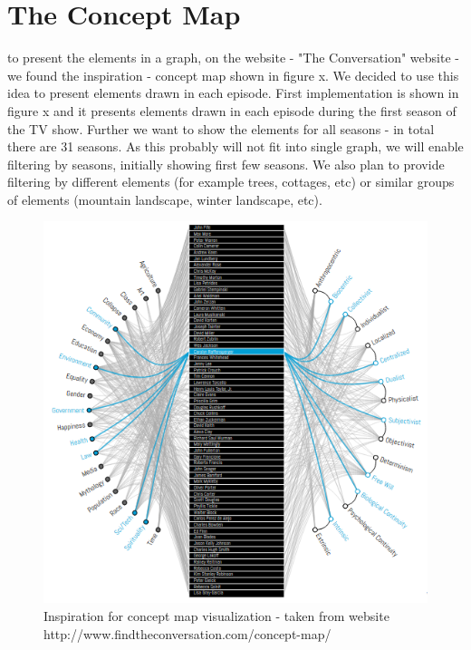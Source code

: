 \documentclass[a4paper]{tufte-book}
\begin{document}
\section{The Concept Map}
 to present the elements in a graph, on the website 
 - "The Conversation" website -  we found the inspiration - concept map shown in figure x. We decided to use this idea to present elements drawn in each episode. First implementation is shown in figure x and it presents elements drawn in each episode during the first season of the TV show. Further we want to show the elements for all seasons - in total there are 31 seasons. As this probably will not fit into single graph, we will enable filtering by seasons, initially showing first few seasons. We also plan to provide filtering by different elements (for example trees, cottages, etc) or similar groups of elements (mountain landscape, winter landscape, etc).

\begin{figure}
	\includegraphics{Images/conceptMapIdea.png}
	\caption{Inspiration for concept map visualization - taken from website http://www.findtheconversation.com/concept-map/}
	\label{fig:concept1}
\end{figure}
\end{document}
